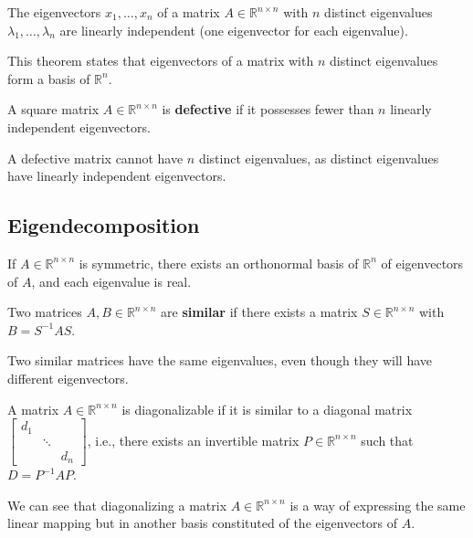 \documentclass{article}
\begin{document}
\begin{theorem}
    The eigenvectors $x_1,\ldots,x_n$ of a matrix $A\in \mathbb{R}^{n\times
    n}$ with $n$ distinct eigenvalues $\lambda_1,\ldots,\lambda_n$ are
    linearly independent (one eigenvector for each eigenvalue).
\end{theorem}
This theorem states that eigenvectors of a matrix with $n$ distinct eigenvalues
form a basis of $\mathbb{R}^n$.
\begin{definition}
    A square matrix $A\in \mathbb{R}^{n\times n}$ is \textbf{defective} if it
    possesses fewer than $n$ linearly independent eigenvectors.
\end{definition}
A defective matrix cannot have $n$ distinct eigenvalues, as distinct
eigenvalues have linearly independent eigenvectors.
\subsection{Eigendecomposition}
\begin{theorem}
    If $A\in \mathbb{R}^{n\times n}$ is symmetric, there exists an orthonormal
    basis of $\mathbb{R}^n$ of eigenvectors of $A$, and each eigenvalue is
    real.
\end{theorem}
\begin{definition}[Similarity]
    Two matrices $A,B\in \mathbb{R}^{n\times n}$ are \textbf{similar} if there
    exists a matrix $S\in \mathbb{R}^{n\times n}$ with $B=S^{-1}AS$.
\end{definition}
Two similar matrices have the same eigenvalues, even though they will have
different eigenvectors.
\begin{definition}[Diagonalizable]
    A matrix $A\in \mathbb{R}^{n\times n}$ is diagonalizable if it is similar
    to a diagonal matrix $\begin{bmatrix}
        d_1 & & \\ 
            & \ddots & \\ 
            & & d_n
    \end{bmatrix}$, i.e., there exists an invertible matrix $P\in
    \mathbb{R}^{n\times n}$ such that $D=P^{-1}AP$.
\end{definition}
We can see that diagonalizing a matrix $A\in \mathbb{R}^{n\times n}$ is a way
of expressing the same linear mapping but in another basis constituted of the
eigenvectors of $A$.
\end{document}
